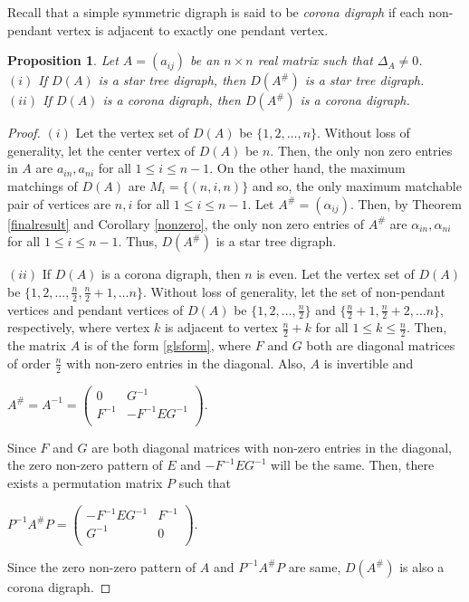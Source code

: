 \documentclass[notitlepage,12pt,reqno]{amsart}
\newtheorem{prop}[thm]{Proposition}
\numberwithin{equation}{section}
\begin{document}
Recall that a simple symmetric digraph is said to be {\it corona digraph} if each non-pendant vertex is adjacent to exactly one pendant vertex.
\begin{prop}\label{starcorona}
Let $A=(a_{ij})$ be an $n\times n$ real matrix such that $\Delta _A\neq 0$.\\
\rm{$(i)$} If $D(A)$ is a star tree digraph, then $D(A^{\#})$ is a star tree digraph.\\
\rm{$(ii)$} If $D(A)$ is a corona digraph, then $D(A^{\#})$ is a corona digraph.
\end{prop}
\begin{proof}
$(i)$ Let the vertex set of $D(A)$ be $\{1,2,\ldots ,n\}$. Without loss of generality, let the center vertex of $D(A)$ be $n$. Then, the only non zero entries in $A$ are $a_{in},a_{ni}$ for all $1\leq i\leq n-1$. On the other hand, the maximum matchings of $D(A)$ are $M_i=\{(n,i,n)\}$ and so, the only maximum matchable pair of vertices are $n,i$ for all $1\leq i\leq n-1$. Let $A^{\#}=(\alpha _{ij})$. Then, by Theorem \ref{finalresult} and Corollary \ref{nonzero}, the only non zero entries of $A^{\#}$ are $\alpha _{in},\alpha _{ni}$ for all $1\leq i\leq n-1$. Thus, $D(A^{\#})$ is a star tree digraph.

$(ii)$ If $D(A)$ is a corona digraph, then $n$ is even. Let the vertex set of $D(A)$ be $\{1,2,\ldots ,\frac{n}{2}, \frac{n}{2} +1,\ldots n\}$. Without loss of generality, let the set of non-pendant vertices and pendant vertices of $D(A)$ be $\{1,2,\ldots ,\frac{n}{2}\}$ and $\{\frac{n}{2} +1,\frac{n}{2} +2,\ldots n\}$, respectively, where vertex $k$ is adjacent to vertex $\frac{n}{2}+k$ for all $1\leq k\leq \frac{n}{2}$. Then, the matrix $A$ is of the form \ref{glsform}, where $F$ and $G$ both are diagonal matrices of order $\frac{n}{2}$ with non-zero entries in the diagonal. Also, $A$ is invertible and 
\begin{center}
$A^{\#}=A^{-1}=\begin{pmatrix}
0 & G^{-1} \\
F^{-1} & -F^{-1}EG^{-1} \\
\end{pmatrix}.$
\end{center}
Since $F$ and $G$ are both diagonal matrices with non-zero entries in the diagonal, the zero non-zero pattern of $E$ and $-F^{-1}EG^{-1}$ will be the same. Then, there exists a permutation matrix $P$ such that
\begin{center}
$P^{-1}A^{\#}P=\begin{pmatrix}
-F^{-1}EG^{-1} & F^{-1} \\
G^{-1} & 0 \\
\end{pmatrix}.$
\end{center}
Since the zero non-zero pattern of $A$ and $P^{-1}A^{\#}P$ are same, $D(A^{\#})$ is also a corona digraph.
\end{proof}
\end{document}
